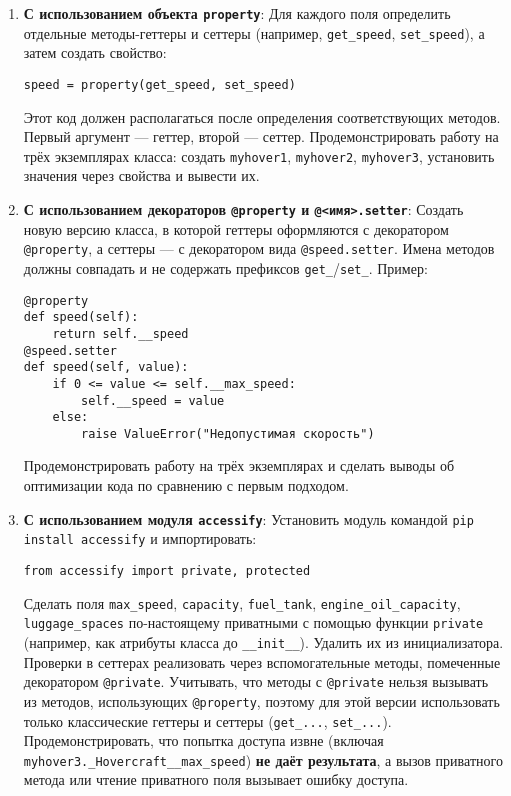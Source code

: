 \begin{enumerate}
\begin{enumerate}
    \item \textbf{С использованием объекта \texttt{property}}:  
    Для каждого поля определить отдельные методы-геттеры и сеттеры (например, \texttt{get\_speed}, \texttt{set\_speed}), а затем создать свойство:  
    \begin{verbatim}
speed = property(get_speed, set_speed)
    \end{verbatim}  
    Этот код должен располагаться после определения соответствующих методов. Первый аргумент — геттер, второй — сеттер.  
    Продемонстрировать работу на трёх экземплярах класса: создать \texttt{myhover1}, \texttt{myhover2}, \texttt{myhover3}, установить значения через свойства и вывести их.
    \item \textbf{С использованием декораторов \texttt{@property} и \texttt{@<имя>.setter}}:  
    Создать новую версию класса, в которой геттеры оформляются с декоратором \texttt{@property}, а сеттеры — с декоратором вида \texttt{@speed.setter}. Имена методов должны совпадать и не содержать префиксов \texttt{get\_}/\texttt{set\_}.  
    Пример:  
    \begin{verbatim}
@property
def speed(self):
    return self.__speed
@speed.setter
def speed(self, value):
    if 0 <= value <= self.__max_speed:
        self.__speed = value
    else:
        raise ValueError("Недопустимая скорость")
    \end{verbatim}  
    Продемонстрировать работу на трёх экземплярах и сделать выводы об оптимизации кода по сравнению с первым подходом.
    \item \textbf{С использованием модуля \texttt{accessify}}:  
    Установить модуль командой \texttt{pip install accessify} и импортировать:  
    \begin{verbatim}
from accessify import private, protected
    \end{verbatim}  
    Сделать поля \texttt{max\_speed}, \texttt{capacity}, \texttt{fuel\_tank}, \texttt{engine\_oil\_capacity}, \texttt{luggage\_spaces} по-настоящему приватными с помощью функции \texttt{private} (например, как атрибуты класса до \texttt{\_\_init\_\_}). Удалить их из инициализатора.  
    Проверки в сеттерах реализовать через вспомогательные методы, помеченные декоратором \texttt{@private}.  
    Учитывать, что методы с \texttt{@private} нельзя вызывать из методов, использующих \texttt{@property}, поэтому для этой версии использовать только классические геттеры и сеттеры (\texttt{get\_...}, \texttt{set\_...}).  
    Продемонстрировать, что попытка доступа извне (включая \texttt{myhover3.\_Hovercraft\_\_max\_speed}) \textbf{не даёт результата}, а вызов приватного метода или чтение приватного поля вызывает ошибку доступа.

\end{enumerate}
\end{enumerate}

